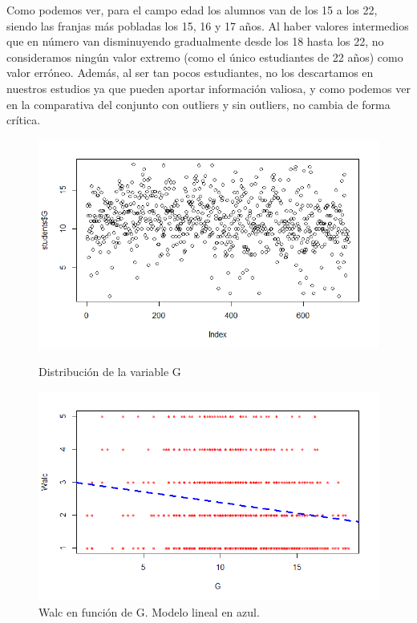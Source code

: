 \documentclass[12pt,a4paper]{article}
\begin{document}
Como podemos ver, para el campo edad los alumnos van de los 15 a los 22, siendo las franjas más pobladas los 15, 16 y 17 años. Al haber valores intermedios que en número van disminuyendo gradualmente desde los 18 hasta los 22, no consideramos ningún valor extremo (como el único estudiantes de 22 años) como valor erróneo. Además, al ser tan pocos estudiantes, no los descartamos en nuestros estudios ya que pueden aportar información valiosa, y como podemos ver en la comparativa del conjunto con outliers y sin outliers, no cambia de forma crítica.

\begin{figure}[h]
  \centering
  \begin{minipage}[b]{0.4\textwidth}
    \includegraphics[trim = 0mm 0mm 0mm 0mm, clip,scale=0.4]{images/outliers_g_1}
    \caption{Distribución de la variable G}
  \end{minipage}
  \hfill
  \begin{minipage}[b]{0.4\textwidth}
    \includegraphics[trim = 0mm 0mm 0mm 0mm, clip,scale=0.4]{images/outliers_g_2}
    \caption{Walc en función de G. Modelo lineal en azul.}
  \end{minipage}
\end{figure}
\end{document}
